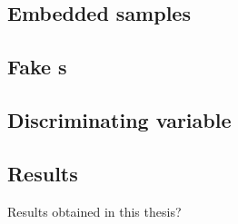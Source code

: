 \subsection*{Embedded samples}


\subsection*{Fake \tauh s}


\subsection*{Discriminating variable}


\subsection*{Results}

\begin{frame}
\begin{center}
\LARGE Results obtained in this thesis?
\end{center}
\end{frame}


